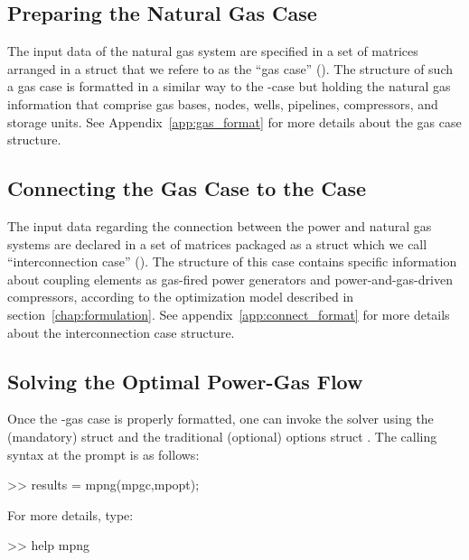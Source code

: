 \subsection{Preparing the Natural Gas Case}
\label{subsec:gas_case}

The input data of the natural gas system are specified in a set of matrices arranged in a \matlab{} struct that we refere to as the ``gas case'' (). The structure of such a gas case is formatted in a similar way to the \matpower{}-case but holding the natural gas information that comprise gas bases, nodes, wells, pipelines, compressors, and storage units. See Appendix~\ref{app:gas_format} for more details about the gas case structure.

\subsection{Connecting the Gas Case to the \matpower{} Case}
\label{subsec:connect_case}

The input data regarding the connection between the power and natural gas systems are declared in a set of matrices packaged as a \matlab{} struct which we call ``interconnection case'' (). The structure of this case contains specific information about coupling elements as gas-fired power generators and power-and-gas-driven compressors, according to the optimization model described in section~\ref{chap:formulation}. See appendix~\ref{app:connect_format} for more details about the interconnection case structure.

\subsection{Solving the Optimal Power-Gas Flow}
\label{subsec:solve_OPGF}

Once the \matpower{}-gas case is properly formatted, one can invoke the solver using the (mandatory)  struct and the traditional (optional) \matpower{} options struct . The calling syntax at the \matlab{} prompt is as follows:  

\begin{Code}	
>> results = mpng(mpgc,mpopt);
\end{Code}

For more details, type:

\begin{Code}
>> help mpng
\end{Code}





